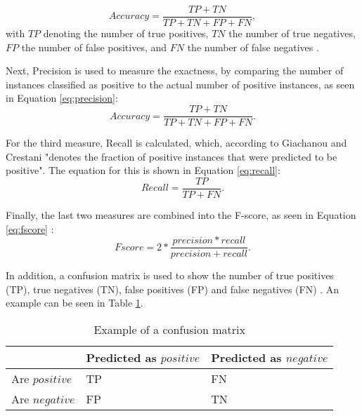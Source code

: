 \begin{equation}
    \label{eq:accuracy}
    Accuracy = \frac{TP + TN}{TP + TN + FP + FN},
\end{equation}
with $TP$ denoting the number of true positives, $TN$ the number of true negatives, $FP$ the number of false positives, and $FN$ the number of false negatives \cite{DBLP:journals/csur/GiachanouC16}. 

Next, Precision is used to measure the exactness, by comparing the number of instances classified as positive to the actual number of positive instances, as seen in Equation \eqref{eq:precision}:
\begin{equation}
    \label{eq:precision}
    Accuracy = \frac{TP + TN}{TP + TN + FP + FN}.
\end{equation}

For the third measure, Recall is calculated, which, according to Giachanou and Crestani "denotes the fraction of positive instances that were predicted to be positive". The equation for this is shown in Equation \eqref{eq:recall}:
\begin{equation}
    \label{eq:recall}
    Recall = \frac{TP}{TP + FN}.
\end{equation}

Finally, the last two measures are combined into the F-score, as seen in Equation \eqref{eq:fscore} \cite{DBLP:journals/csur/GiachanouC16}:
\begin{equation}
    \label{eq:fscore}
    Fscore = 2*\frac{precision * recall}{precision + recall}.
\end{equation}

In addition, a confusion matrix is used to show the number of true positives (TP), true negatives (TN), false positives (FP) and false negatives (FN) \cite{DBLP:journals/csur/GiachanouC16}. An example can be seen in Table \ref{tab:conf_example}.

\begin{table}[h!]
\centering
\caption{Example of a confusion matrix \cite[p.~28:11]{DBLP:journals/csur/GiachanouC16}}
\begin{tabular}{ |p{3cm}||p{3cm}|p{3cm}| }
 \hline
  &          Predicted as $positive$ &Predicted as $negative$  \\
 \hline
 Are $positive$        & TP&            FN\\
  \hline
 Are $negative$  &FP&                     TN\\
 \hline

\end{tabular}
\label{tab:conf_example}
\end{table}


